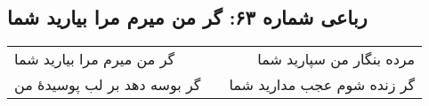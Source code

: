 \begin{center}
\section*{رباعی شماره ۶۳: گر من میرم مرا بیارید شما}
\label{sec:0063}
\begin{longtable}{l p{0.5cm} r}
گر من میرم مرا بیارید شما
&&
مرده بنگار من سپارید شما
\\
گر بوسه دهد بر لب پوسیدهٔ من
&&
گر زنده شوم عجب مدارید شما
\\
\end{longtable}
\end{center}
